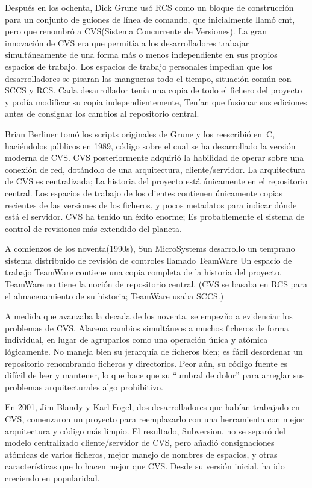 Después en los ochenta, Dick Grune usó RCS como un bloque de
construcción para un conjunto de guiones de línea de comando, que
inicialmente llamó cmt, pero que renombró a CVS(Sistema Concurrente de
Versiones).  La gran innovación de CVS era que permitía a los
desarrolladores trabajar simultáneamente de una forma más o menos
independiente en sus propios espacios de trabajo. Los espacios de
trabajo personales impedian que los desarrolladores se pisaran las
mangueras todo el tiempo, situación común con SCCS y RCS.  Cada
desarrollador tenía una copia de todo el fichero del proyecto y podía
modificar su copia independientemente, Tenían que fusionar sus
ediciones antes de consignar los cambios al repositorio central.

Brian Berliner tomó los scripts originales de Grune y los reescribió
en~C, haciéndolos públicos en 1989, código sobre el cual se ha
desarrollado la versión moderna de CVS.  CVS posteriormente adquirió
la habilidad de operar sobre una conexión de red, dotándolo de una
arquitectura, cliente/servidor. La arquitectura de CVS es
centralizada; La historia del proyecto está únicamente en el
repositorio central.  Los espacios de trabajo de los clientes
contienen únicamente copias recientes de las versiones de los
ficheros, y pocos metadatos para indicar dónde está el servidor. CVS
ha tenido un éxito enorme; Es probablemente el sistema de control de
revisiones más extendido del planeta.

A comienzos de los noventa(1990s), Sun MicroSystems desarrollo un
temprano sistema distribuido de revisión de controles llamado TeamWare
Un espacio de trabajo TeamWare contiene una copia completa de la
historia del proyecto. TeamWare no tiene la noción de repositorio
central. (CVS se basaba en RCS para el almacenamiento de su historia;
TeamWare usaba SCCS.)

A medida que avanzaba la decada de los noventa, se empezño a
evidenciar los problemas de CVS.  Alacena cambios simultáneos a muchos
ficheros de forma individual, en lugar de agruparlos como una
operación única y atómica lógicamente.  No maneja bien su jerarquía de
ficheros bien; es fácil desordenar un repositorio renombrando ficheros
y directorios. Peor aún, su código fuente es difícil de leer y
mantener, lo que hace que su ``umbral de dolor'' para arreglar sus
problemas arquitecturales algo prohibitivo.

En 2001, Jim Blandy y Karl Fogel, dos desarrolladores que habían
trabajado en CVS, comenzaron un proyecto para reemplazarlo con una
herramienta con mejor arquitectura y código más limpio.  El resultado,
Subversion, no se separó del modelo centralizado cliente/servidor de
CVS, pero añadió consignaciones atómicas de varios ficheros, mejor
manejo de nombres de espacios, y otras características que lo hacen
mejor que CVS. Desde su versión inicial, ha ido creciendo en
popularidad.

